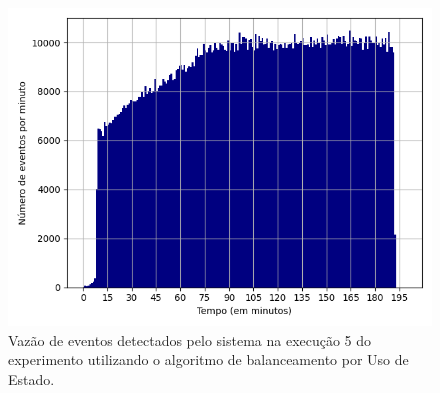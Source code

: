 



\begin{figure}[h]
\centering
\includegraphics[width=\textwidth]{figuras/graphics/histogram_vazao_10-dez-su.png}
\caption{Vazão de eventos detectados pelo sistema na execução 5 do experimento utilizando o algoritmo de balanceamento por Uso de Estado.}
\label{fig:vazao_9-dez-su}
\end{figure}






